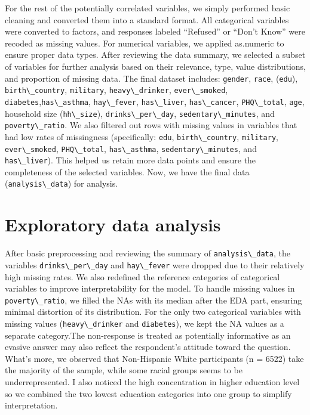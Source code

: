 \documentclass[
  11pt,
]{article}
\newcommand{\passthrough}[1]{#1}
\begin{document}
For the rest of the potentially correlated variables, we simply performed basic cleaning and converted them into a standard format. All categorical variables were converted to factors, and responses labeled ``Refused'' or ``Don't Know'' were recoded as missing values. For numerical variables, we applied as.numeric to ensure proper data types. After reviewing the data summary, we selected a subset of variables for further analysis based on their relevance, type, value distributions, and proportion of missing data. The final dataset includes: \passthrough{\lstinline!gender!}, \passthrough{\lstinline!race!}, (\passthrough{\lstinline!edu!}), \passthrough{\lstinline!birth\_country!}, \passthrough{\lstinline!military!}, \passthrough{\lstinline!heavy\_drinker!}, \passthrough{\lstinline!ever\_smoked!}, \passthrough{\lstinline!diabetes!},\passthrough{\lstinline!has\_asthma!}, \passthrough{\lstinline!hay\_fever!}, \passthrough{\lstinline!has\_liver!}, \passthrough{\lstinline!has\_cancer!}, \passthrough{\lstinline!PHQ\_total!}, \passthrough{\lstinline!age!}, household size (\passthrough{\lstinline!hh\_size!}), \passthrough{\lstinline!drinks\_per\_day!}, \passthrough{\lstinline!sedentary\_minutes!}, and \passthrough{\lstinline!poverty\_ratio!}. We also filtered out rows with missing values in variables that had low rates of missingness (specifically: \passthrough{\lstinline!edu!}, \passthrough{\lstinline!birth\_country!}, \passthrough{\lstinline!military!}, \passthrough{\lstinline!ever\_smoked!}, \passthrough{\lstinline!PHQ\_total!}, \passthrough{\lstinline!has\_asthma!}, \passthrough{\lstinline!sedentary\_minutes!}, and \passthrough{\lstinline!has\_liver!}). This helped us retain more data points and ensure the completeness of the selected variables. Now, we have the final data (\passthrough{\lstinline!analysis\_data!}) for analysis.

\section{Exploratory data analysis}\label{exploratory-data-analysis}

After basic preprocessing and reviewing the summary of \passthrough{\lstinline!analysis\_data!}, the variables \passthrough{\lstinline!drinks\_per\_day!} and \passthrough{\lstinline!hay\_fever!} were dropped due to their relatively high missing rates. We also redefined the reference categories of categorical variables to improve interpretability for the model. To handle missing values in \passthrough{\lstinline!poverty\_ratio!}, we filled the NAs with its median after the EDA part, ensuring minimal distortion of its distribution. For the only two categorical variables with missing values (\passthrough{\lstinline!heavy\_drinker!} and \passthrough{\lstinline!diabetes!}), we kept the NA values as a separate category.The non-response is treated as potentially informative as an evasive answer may also reflect the respondent's attitude toward the question. What's more, we observed that Non-Hispanic White participants (n = 6522) take the majority of the sample, while some racial groups seems to be underrepresented. I also noticed the high concentration in higher education level so we combined the two lowest education categories into one group to simplify interpretation.
\end{document}
